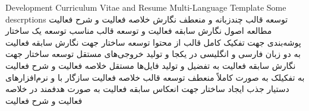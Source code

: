 
\projectC
{Development Curriculum Vitae and Resume Multi-Language Template}
{Some descrptions}
{توسعه قالب چندزبانه و منعطف نگارش خلاصه فعالیت و شرح فعالیت}
{مطالعه اصول نگارش سابقه فعالیت و توسعه قالب مناسب
توسعه یک ساختار پوشه‌بندی جهت تفکیک کامل قالب از محتوا
توسعه ساختار جهت نگارش سابقه فعالیت به دو زبان فارسی و انگلیسی در یکجا و تولید خروجی‌های مستقل
توسعه ساختار جهت نگارش سابقه فعالیت به تفضیل و تولید فایل‌ها مستقل خلاصه فعالیت و شرح فعالیت به تفکیلک به صورت کاملاً منعطف
توسعه قالب خلاصه فعالیت سازگار با  و نرم‌افزارهای دستیار جذب
ایجاد ساختار جهت انعکاس سابقه فعالیت به صورت هدفمند در خلاصه فعالیت و شرح فعالیت}





